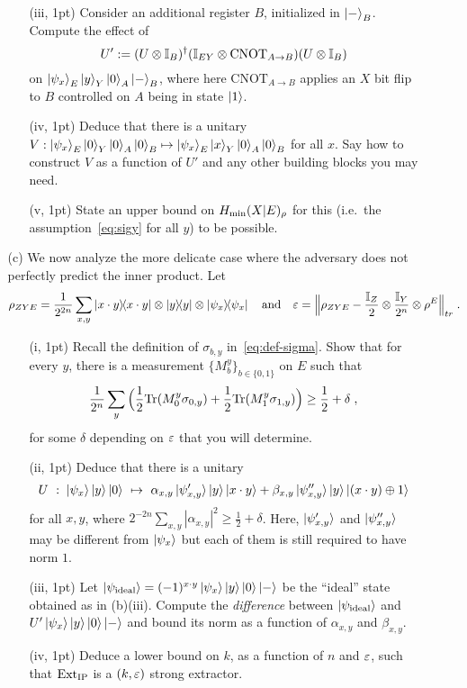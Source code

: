 \documentclass[12pt]{article}
\begin{document}
\begin{enumerate}
\begin{enumerate}
\begin{enumerate}
\item[(iii, 1pt)] Consider an additional register $B$, initialized in $\ket{-}_B$. Compute the effect of  
\[  U':=(U\otimes \mathbb{I}_B)^\dagger (\mathbb{I}_{EY}\otimes \mathrm{CNOT}_{A\to B})(U\otimes \mathbb{I}_{B})\]
 on $\ket{\psi_x}_E\ket{y}_Y\ket{0}_A\ket{-}_B$, where here  $\mathrm{CNOT}_{A\to B}$ applies an $X$ bit flip to $B$ controlled on $A$ being in state $\ket{1}$.
\item[(iv, 1pt)] Deduce that there is a unitary $V: \ket{\psi_x}_E\ket{0}_Y\ket{0}_A\ket{0}_B\mapsto \ket{\psi_x}_E\ket{x}_Y\ket{0}_A\ket{0}_B$ for all $x$. Say how to construct $V$ as a function of $U'$ and any other building blocks you may need. 
\item[(v, 1pt)] State an upper bound on $H_{\rm min}(X|E)_\rho$ for this (i.e.\ the assumption~\eqref{eq:sigy} for all $y$) to be possible. 
\end{enumerate}
\item[(c)] We now analyze the more delicate case where the adversary does not perfectly predict the inner product. Let 
\[ \rho_{ZYE}=\frac{1}{2^{2n}}\sum_{x,y} \ket{x\cdot y}\!\!\bra{x\cdot y}\otimes \ket{y}\!\!\bra{y}\otimes\ket{\psi_x}\!\!\bra{\psi_x}\quad\text{and}\quad\varepsilon = \Big\|\rho_{ZYE} - \frac{\mathbb{I}_Z}{2} \otimes \frac{\mathbb{I}_Y}{2^n}  \otimes \rho^E\Big\|_{tr}\;.\]
 \begin{enumerate}
\item[(i, 1pt)] Recall the definition of $\sigma_{b,y}$ in~\eqref{eq:def-sigma}. 
 Show that for every $y$, there is a measurement $\{M^y_b\}_{b\in\{0,1\}}$ on $E$ such that 
\[\frac{1}{2^n}\sum_y \Big(  \frac{1}{2}\mathrm{Tr}(M^y_{0} \sigma_{0,y})+\frac{1}{2}\mathrm{Tr}(M^y_{1} \sigma_{1,y})\Big) \geq \frac{1}{2}+\delta\;,\]
 for some $\delta$ depending on $\varepsilon$ that you will determine. 
\item[(ii, 1pt)] Deduce that there is a unitary 
\[ U\ :\; \ket{\psi_x}\ket{y}\ket{0} \ \mapsto\ \alpha_{x,y}\ket{\psi'_{x, y}}\ket{y}\ket{x\cdot y}+\beta_{x,y}\ket{\psi''_{x, y}}\ket{y}\ket{(x\cdot y)\oplus 1}\]
 for all $x,y$, where $2^{-2n}\sum_{x,y} |\alpha_{x,y}|^2 \geq \frac{1}{2} + \delta$. Here, $\ket{\psi'_{x, y}}$ and $\ket{\psi''_{x, y}}$ may be different from $\ket{\psi_x}$ but each of them is still required to have norm $1$.
\item[(iii, 1pt)] Let $\ket{\psi_{\mathrm{ideal}}} = (-1)^{x\cdot y}\ket{\psi_x}\ket{y}\ket{0}\ket{-}$ be the ``ideal'' state obtained as in (b)(iii). Compute the \emph{difference} between $\ket{\psi_{\mathrm{ideal}}}$ and $U'\ket{\psi_x}\ket{y}\ket{0}\ket{-}$ and bound its norm as a function of $\alpha_{x, y}$ and $\beta_{x, y}$.
\item[(iv, 1pt)] Deduce a lower bound on $k$, as a function of $n$ and $\varepsilon$, such that $\mathrm{Ext}_{\mathrm{IP}}$ is a $(k,\varepsilon)$ strong extractor.  
\end{enumerate}
\end{enumerate}

\end{enumerate}
\end{document}
